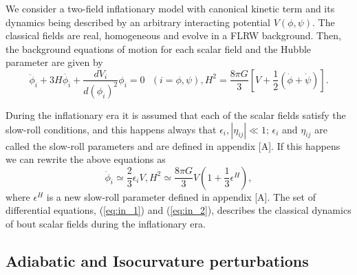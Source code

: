\documentclass[amssymb,twocolumn,prd,nofootinbib,showpacs]{revtex4-1}
\begin{document}
We consider a two-field inflationary model with canonical kinetic term and  its dynamics being described by an arbitrary 
interacting potential $V(\phi,\psi)$. The classical fields are real, homogeneous and evolve in a FLRW background. 
Then, the background equations of motion for each scalar field and the Hubble parameter are given by
%
\begin{subequations}
\begin{equation}\label{KGEq}
\ddot{\phi}_i+3H\dot{\phi_i}+\frac{dV_i}{d(\phi_i)^2}\phi_i=0 \ \ \ (i=\phi,\psi),
\end{equation}
\begin{equation}
H^2=\frac{8\pi G}{3}\left[V+\frac{1}{2}\left(\dot{\phi}+\dot\psi\right)\right].
\end{equation}
\end{subequations}

During the inflationary era it is assumed that each of the scalar fields satisfy the slow-roll conditions, and 
this happens always that $\epsilon_i,|\eta_{ij}|\ll 1$; $\epsilon_i$ and $\eta_{ij}$ are called the slow-roll parameters 
and are defined in appendix [A]. If this happens we can rewrite the above equations as
%
\begin{subequations}
\begin{equation}\label{eq:in_1}
\dot{\phi}_i\simeq \frac{2}{3}\epsilon_i V,
\end{equation}
\begin{equation}\label{eq:in_2}
H^2\simeq \frac{8\pi G}{3}V\left(1+\frac{1}{3}\epsilon^H\right),
\end{equation}
\end{subequations}
%
where $\epsilon^H$ is a new slow-roll parameter defined in appendix [A]. 
The set of differential equations, (\ref{eq:in_1}) and (\ref{eq:in_2}),  
describes the classical dynamics of bout scalar fields during the inflationary era.

\subsection{Adiabatic and Isocurvature perturbations}
\end{document}
